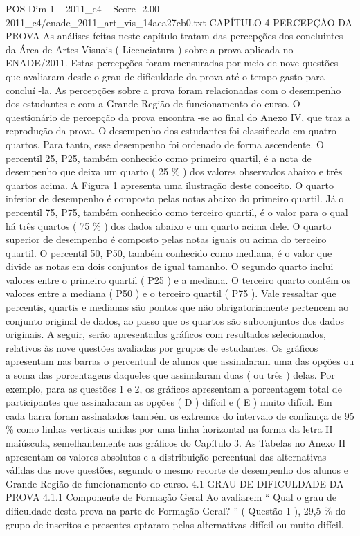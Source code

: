 \begin{textsample}{POS Dim 1 – 2011\_c4 – Score -2.00 – 2011\_c4/enade\_2011\_art\_vis\_14aea27cb0.txt}  \label{ex:f1_pos_321}
CAPÍTULO 4 PERCEPÇÃO DA PROVA As análises feitas neste capítulo tratam das percepções dos concluintes da Área de Artes Visuais ( Licenciatura ) sobre a prova aplicada no ENADE/2011.
Estas percepções foram mensuradas por meio de nove questões que avaliaram desde o grau de dificuldade da prova até o tempo gasto para concluí -la.
As percepções sobre a prova foram relacionadas com o desempenho dos estudantes e com a Grande Região de funcionamento do curso.
O questionário de percepção da prova encontra -se ao final do Anexo IV, que traz a reprodução da prova.
O desempenho dos estudantes foi classificado em quatro quartos.
Para tanto, esse desempenho foi ordenado de forma ascendente.
O percentil 25, P25, também conhecido como primeiro quartil, é a nota de desempenho que deixa um quarto ( 25 \% ) dos valores observados abaixo e três quartos acima.
A Figura 1 apresenta uma ilustração deste conceito.
O quarto inferior de desempenho é composto pelas notas abaixo do primeiro quartil.
Já o percentil 75, P75, também conhecido como terceiro quartil, é o valor para o qual há três quartos ( 75 \% ) dos dados abaixo e um quarto acima dele.
O quarto superior de desempenho é composto pelas notas iguais ou acima do terceiro quartil.
O percentil 50, P50, também conhecido como mediana, é o valor que divide as notas em dois conjuntos de igual tamanho.
O segundo quarto inclui valores entre o primeiro quartil ( P25 ) e a mediana.
O terceiro quarto contém os valores entre a mediana ( P50 ) e o terceiro quartil ( P75 ).
Vale ressaltar que percentis, quartis e medianas são pontos que não obrigatoriamente pertencem ao conjunto original de dados, ao passo que os quartos são subconjuntos dos dados originais.
A seguir, serão apresentados gráficos com resultados selecionados, relativos às nove questões avaliadas por grupos de estudantes.
Os gráficos apresentam nas barras o percentual de alunos que assinalaram uma das opções ou a soma das porcentagens daqueles que assinalaram duas ( ou três ) delas.
Por exemplo, para as questões 1 e 2, os gráficos apresentam a porcentagem total de participantes que assinalaram as opções ( D ) difícil e ( E ) muito difícil.
Em cada barra foram assinalados também os extremos do intervalo de confiança de 95 \% como linhas verticais unidas por uma linha horizontal na forma da letra H maiúscula, semelhantemente aos gráficos do Capítulo 3.
As Tabelas no Anexo II apresentam os valores absolutos e a distribuição percentual das alternativas válidas das nove questões, segundo o mesmo recorte de desempenho dos alunos e Grande Região de funcionamento do curso. 4.1 GRAU DE DIFICULDADE DA PROVA 4.1.1 Componente de Formação Geral Ao avaliarem “ Qual o grau de dificuldade desta prova na parte de Formação Geral? ” ( Questão 1 ), 29,5 \% do grupo de inscritos e presentes optaram pelas alternativas difícil ou muito difícil.

\end{textsample}
